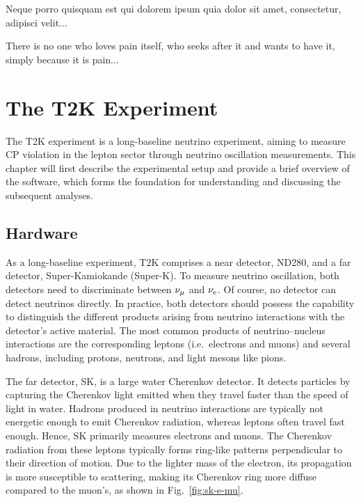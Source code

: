 \begin{savequote}[8cm]
\textlatin{Neque porro quisquam est qui dolorem ipsum quia dolor sit amet, consectetur, adipisci velit...}

There is no one who loves pain itself, who seeks after it and wants to have it, simply because it is pain...
\end{savequote}

\chapter{\label{ch:t2k}The T2K Experiment} 

\minitoc
The T2K experiment is a long-baseline neutrino experiment, aiming to measure CP violation in the lepton sector through neutrino oscillation measurements.
This chapter will first describe the experimental setup and provide a brief overview of the software, which forms the foundation for understanding and discussing the subsequent analyses.


\section{Hardware}
As a long-baseline experiment, T2K comprises a near detector, ND280, and a far detector, Super-Kamiokande (Super-K).
To measure neutrino oscillation, both detectors need to discriminate between \(\nu_{\mu}\) and \(\nu_{\textrm{e}}\).  
Of course, no detector can detect neutrinos directly.
In practice, both detectors should possess the capability to distinguish the different products arising from neutrino interactions with the detector’s active material.
The most common products of neutrino–nucleus interactions are the corresponding leptons (i.e.\ electrons and muons) and several hadrons, including protons, neutrons, and light mesons like pions.

The far detector, SK, is a large water Cherenkov detector.
It detects particles by capturing the Cherenkov light emitted when they travel faster than the speed of light in water.
Hadrons produced in neutrino interactions are typically not energetic enough to emit Cherenkov radiation, whereas leptons often travel fast enough.
Hence, SK primarily measures electrons and muons.
The Cherenkov radiation from these leptons typically forms ring-like patterns perpendicular to their direction of motion.
Due to the lighter mass of the electron, its propagation is more susceptible to scattering, making its Cherenkov ring more diffuse compared to the muon’s, as shown in Fig.~\ref{fig:sk-e-mu}.

